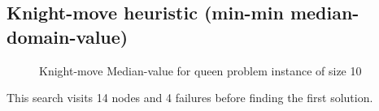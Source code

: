 \documentclass[a4paper, 11pt]{article}
\begin{document}
\subsection{Knight-move heuristic (min-min median-domain-value)}
\begin{figure}[H]
  \begin{center}
    \caption{Knight-move Median-value for queen problem instance of size 10}
    \label{fig:kmm10}
  \end{center}
\end{figure}
This search visits 14 nodes and 4 failures before finding the first solution.
\end{document}
